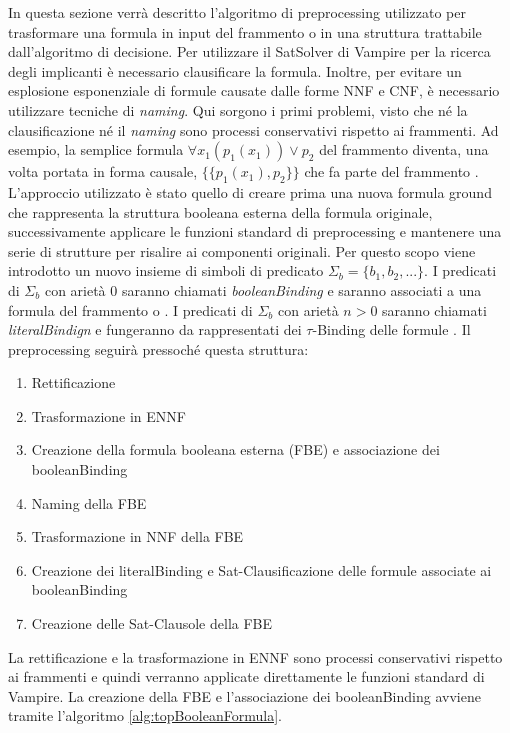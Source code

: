 \documentclass[./main.tex]{subfiles}
\begin{document}
In questa sezione verrà descritto l'algoritmo di preprocessing utilizzato per trasformare una formula in input
del frammento \ob o \cb in una struttura trattabile dall'algoritmo di decisione.
Per utilizzare il SatSolver di Vampire per la ricerca degli implicanti è necessario clausificare la formula.
Inoltre, per evitare un esplosione esponenziale di formule causate dalle forme NNF e CNF, è necessario utilizzare tecniche di \textit{naming}.
Qui sorgono i primi problemi, visto che né la clausificazione né il \textit{naming} sono processi conservativi rispetto ai frammenti.
Ad esempio, la semplice formula $\forall x_1 (p_1(x_1)) \lor p_2$ del frammento \ob diventa, una volta portata in forma causale,  $\{\{p_1(x_1), p_2\}\}$ che fa parte del frammento \dbb.
L'approccio utilizzato è stato quello di creare prima una nuova formula ground che rappresenta la struttura booleana esterna della formula originale,
successivamente applicare le funzioni standard di preprocessing
e mantenere una serie di strutture per risalire ai componenti originali.
Per questo scopo viene introdotto un nuovo insieme di simboli di predicato $\Sigma_b = \{b_1, b_2, ...\}$.
I predicati di $\Sigma_b$ con arietà 0 saranno chiamati \textit{booleanBinding} e saranno associati a una formula del frammento \ob o \cb.
I predicati di $\Sigma_b$ con arietà $n > 0$ saranno chiamati \textit{literalBindign} e fungeranno da rappresentati dei $\tau$-Binding delle formule \ob.
Il preprocessing seguirà pressoché questa struttura:

\begin{enumerate}
    \item Rettificazione
    \item Trasformazione in ENNF
    \item Creazione della formula booleana esterna (FBE) e associazione dei booleanBinding
    \item Naming della FBE
    \item Trasformazione in NNF della FBE
    \item Creazione dei literalBinding e Sat-Clausificazione delle formule associate ai booleanBinding
    \item Creazione delle Sat-Clausole della FBE
\end{enumerate}

La rettificazione e la trasformazione in ENNF sono processi conservativi rispetto ai frammenti e quindi verranno applicate 
direttamente le funzioni standard di Vampire.
La creazione della FBE e l'associazione dei booleanBinding avviene tramite l'algoritmo \ref{alg:topBooleanFormula}.
\end{document}
